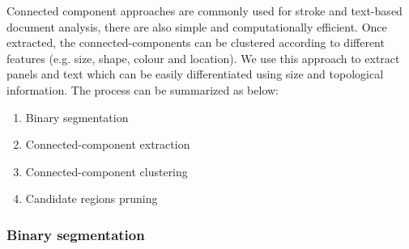 Connected component approaches are commonly used for stroke and text-based document analysis, there are also simple and computationally efficient.
Once extracted, the connected-components can be clustered according to different features (e.g. size, shape, colour and location).
We use this approach to extract panels and text which can be easily differentiated using size and topological information.
The process can be summarized as below:
  \begin{enumerate}
	\item Binary segmentation
	\item Connected-component extraction
	\item Connected-component clustering
	\item Candidate regions pruning
  \end{enumerate}


\subsubsection{Binary segmentation} %
\label{par:se:image_segmentation}

